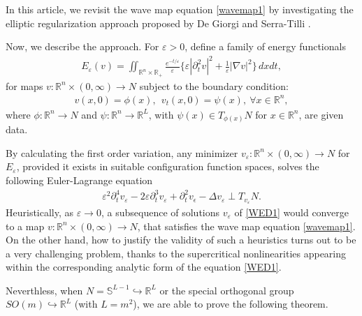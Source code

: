 \documentclass[12pt,twoside,reqno]{amsart}
\theoremstyle{definition}              %
\theoremstyle{remark}                  %
\newcommand{\R}{\mathbb{R}}                 %
\newcommand{\eps}{\varepsilon}
\renewcommand{\1}{\mathbbm{1}}                                      %
\numberwithin{equation}{section}
\numberwithin{definition}{section}
\numberwithin{theorem}{section}
\numberwithin{remark}{section}
\begin{document}
In this article, we revisit the wave map equation \eqref{wavemap1} by investigating the elliptic regularization approach proposed by De Giorgi \cite{Giorgi1996} and Serra-Tilli \cite{Serra-Tilli2012, Serra-Tilli2016}.

Now, we describe the approach. For $\eps>0$, define a family of
energy functionals
\begin{align}
{E}_\eps(v)=\iint_{\mathbb R^n\times\R_+} \frac{e^{-t/\eps}}{\eps}
\Big\{\eps|\partial_t^2v|^2+\frac{1}{\eps}|\nabla v|^2\Big\}\,dxdt,
\end{align}
for maps $v:\mathbb{R}^n\times (0,\infty)\to N$ subject to the boundary condition:
\begin{align}
v(x,0)=\phi(x), \ \ v_t(x,0)=\psi(x), 
\ \forall x\in\mathbb{R}^n,
\end{align}
where $\phi:\mathbb{R}^n\to N$
and $\psi:\mathbb{R}^n\to \mathbb{R}^L$,
with $\psi(x)\in T_{\phi(x)}N$ for $x\in\mathbb{R}^n$, are given data.

By calculating the first order variation, any minimizer $v_\eps:
\R^n\times (0,\infty)\to N$ for ${E}_\eps$, provided it exists in suitable configuration function spaces,  
solves the following Euler-Lagrange equation
\begin{align}\label{WED1}
\eps^2 \partial_{t}^4v_\eps-2\eps \partial_t^3v_\eps+
\partial_t^2v_\epsilon-\Delta v_\eps
\perp T_{v_\eps} N.
\end{align}
Heuristically, as $\eps\to 0$, a subsequence of solutions $v_\eps$ of \eqref{WED1} would converge to a map $v:\R^n\times (0,\infty)\to N$, that satisfies the wave map equation \eqref{wavemap1}. On the other hand, how to justify the validity of such a heuristics turns out to be a very challenging problem, thanks to the supercritical nonlinearities appearing within the corresponding analytic form of the equation \eqref{WED1}.

Neverthless, when $N=\mathbb{S}^{L-1}\hookrightarrow\mathbb R^L$ or 
the special orthogonal group $SO(m)\hookrightarrow\R^L$ 
(with $L={m^2}$),
we are able to prove the following theorem.
\end{document}
